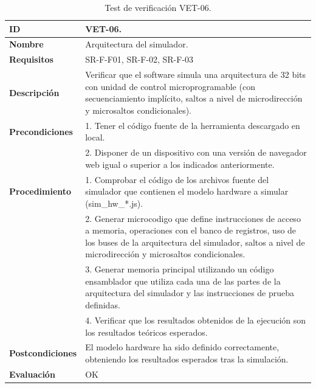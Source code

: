\begin{center}
\begin{table}[htb]
\centering
\caption{Test de verificación VET-06.}
\begin{tabular}{@{}p{2.5cm} p{13cm}@{}} 
\toprule
\textbf{ID} 					& VET-06. \\
\midrule
\textbf{Nombre} 				& Arquitectura del simulador. \\
\midrule
\textbf{Requisitos} 		& SR-F-F01, SR-F-02, SR-F-03\\
\midrule
\textbf{Descripción} 		& Verificar que el \gls{software} simula una arquitectura de 32 bits con unidad de control microprogramable (con secuenciamiento implícito, saltos a nivel de microdirección y microsaltos condicionales). \\
\midrule
\textbf{Precondiciones}		& 1. Tener el código fuente de la herramienta descargado en local. \\
											& 2. Disponer de un dispositivo con una versión de navegador web igual o superior a los indicados anteriormente. \\
\midrule
\textbf{Procedimiento}		& 1. Comprobar el código de los archivos fuente del simulador que contienen el modelo \gls{hardware} a simular (sim\_hw\_*.js).\\
											& 2. Generar \gls{microcodigo} que define instrucciones de acceso a memoria, operaciones con el banco de registros, uso de los buses de la arquitectura del simulador, saltos a nivel de microdirección y microsaltos condicionales.\\
											& 3. Generar memoria principal utilizando un código \gls{ensamblador} que utiliza cada una de las partes de la arquitectura del simulador y las instrucciones de prueba definidas.\\
							& 4. Verificar que los resultados obtenidos de la ejecución son los resultados teóricos esperados.\\
\midrule
\textbf{Postcondiciones} 		&  El modelo \gls{hardware} ha sido definido correctamente, obteniendo los resultados esperados tras la simulación.\\
\midrule
\textbf{Evaluación} 			& OK \\
\bottomrule
\end{tabular}
\label{tab:vet06}
\end{table}
\end{center}


